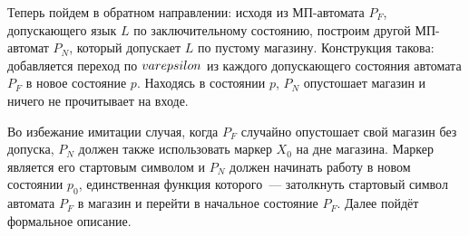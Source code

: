 \documentclass[a4paper,12pt]{article}
\begin{document}
Теперь пойдем в обратном направлении: исходя из МП-автомата \(P_F\), допускающего язык \(L\) по заключительному состоянию, построим другой МП-автомат \(P_N\), который допускает \(L\) по пустому магазину. Конструкция такова: добавляется переход по \(\\varepsilon\) из каждого допускающего состояния автомата \(P_F\) в новое состояние \(p\). Находясь в состоянии \(p\), \(P_N\) опустошает магазин и ничего не прочитывает на входе. 

Во избежание имитации случая, когда \(P_F\) случайно опустошает свой магазин без допуска, \(P_N\) должен также использовать маркер \(X_0\) на дне магазина. Маркер является его стартовым символом и \(P_N\) должен начинать работу в новом состоянии \(p_0\), единственная функция которого~--- затолкнуть стартовый символ автомата \(P_F\) в магазин и перейти в начальное состояние \(P_F\). Далее пойдёт формальное описание.
\end{document}
